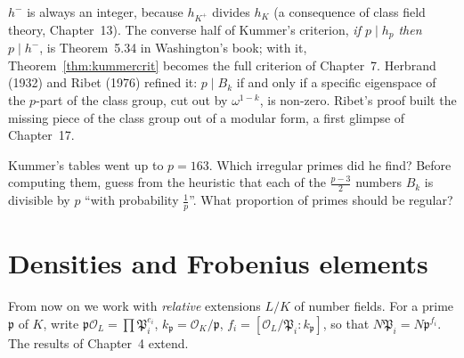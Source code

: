 \begin{remark}
$h^-$ is always an integer, because $h_{K^+}$ divides $h_K$ (a consequence of class field theory, Chapter~13). The converse half of Kummer's
criterion, \emph{if $p\mid h_p$ then $p\mid h^-$}, is Theorem~5.34 in Washington's book; with it, Theorem~\ref{thm:kummercrit} becomes the full
criterion of Chapter~7. Herbrand (1932) and Ribet (1976) refined it: $p\mid B_k$ if and only if a specific eigenspace of the $p$-part of the
class group, cut out by $\omega^{1-k}$, is non-zero. Ribet's proof built the missing piece of the class group out of a modular form, a first
glimpse of Chapter~17.
\end{remark}

\begin{think}
Kummer's tables went up to $p=163$. Which irregular primes did he find? Before computing them, guess from the heuristic that
each of the $\frac{p-3}2$ numbers $B_k$ is divisible by $p$ ``with probability $\frac1p$''. What proportion of primes should be regular?
\end{think}

\section{Densities and Frobenius elements}

From now on we work with \emph{relative} extensions $L/K$ of number fields. For a prime $\mathfrak p$ of $K$, write $\mathfrak p\mathcal O_L=
\prod\mathfrak P_i^{e_i}$, $k_{\mathfrak p}=\mathcal O_K/\mathfrak p$, $f_i=[\mathcal O_L/\mathfrak P_i:k_{\mathfrak p}]$, so that $N\mathfrak P_i=
N\mathfrak p^{f_i}$. The results of Chapter~4 extend.

